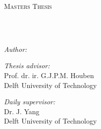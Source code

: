 \documentclass[
11pt, %
english, %
singlespacing, %
headsepline, %
]{MastersDoctoralThesis} %
\author{Philippe Lammerts} %
\begin{document}
\frontmatter %

\pagestyle{plain} %


\begin{titlepage}
    \begin{center}

        \vspace*{.06\textheight}
        {\scshape\LARGE \univname\par}\vspace{1.5cm} %
        \textsc{\Large Masters Thesis}\\[0.5cm] %

        \HRule \\[0.4cm] %
        {\huge \bfseries \ttitle\par}\vspace{0.4cm} %
        \HRule \\[1.5cm] %

        \begin{minipage}[t]{0.4\textwidth}
            \begin{flushleft} \large
                \emph{Author:}\\
                \authorname %
            \end{flushleft}
        \end{minipage}
        \begin{minipage}[t]{0.5\textwidth}
            \begin{flushright} \large
                \emph{Thesis advisor:}\\
                Prof. dr. ir. G.J.P.M. Houben\\
                Delft University of Technology
            \end{flushright}

            \begin{flushright} \large
                \emph{Daily supervisor:} \\
                Dr. J. Yang\\
                Delft University of Technology
            \end{flushright}


\end{minipage}
\end{center}
\end{titlepage}
\end{document}
